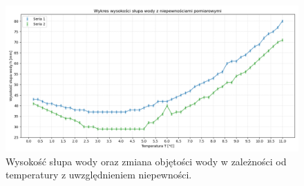 \documentclass[a4paper,12pt]{article}
\begin{document}
\begin{figure}[H]
    \centering
    \includegraphics[width=0.9\textheight,angle=90]{height_vs_temperature_uncertainties.png}
    \caption{Wysokość słupa wody oraz zmiana objętości wody w zależności od temperatury z uwzględnieniem niepewności.}
    \label{fig:height_vs_temperature_with_uncertainties}
\end{figure}



\end{document}
